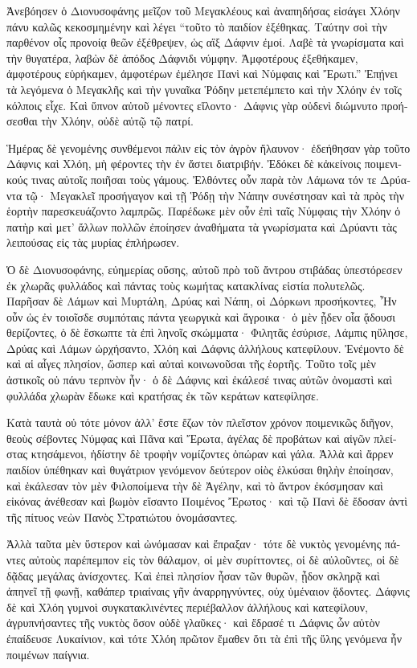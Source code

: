 \documentclass{book}
\begin{document}
\begin{pairs}
\begin{Leftside}
\begin{greek}
  Ἀνεβόησεν ὁ Διονυσοφάνης μεῖζον τοῦ Μεγακλέους καὶ ἀναπηδήσας εἰσάγει Χλόην πάνυ καλῶς κεκοσμημένην καὶ λέγει “τοῦτο τὸ παιδίον ἐξέθηκας. Ταύτην σοὶ τὴν παρθένον οἶς προνοίᾳ θεῶν ἐξέθρεψεν,  ὡς αἲξ Δάφνιν ἐμοί. Λαβὲ τὰ γνωρίσματα καὶ τὴν θυγατέρα, λαβὼν δὲ ἀπόδος Δάφνιδι νύμφην. Ἀμφοτέρους ἐξεθήκαμεν, ἀμφοτέρους εὑρήκαμεν, ἀμφοτέρων ἐμέλησε Πανὶ καὶ Νύμφαις καὶ Ἔρωτι.”  Ἐπῄνει τὰ λεγόμενα ὁ Μεγακλῆς καὶ τὴν γυναῖκα Ῥόδην μετεπέμπετο καὶ τὴν Χλόην ἐν τοῖς κόλποις εἶχε. Καὶ ὕπνον αὐτοῦ μένοντες εἵλοντο· Δάφνις γὰρ οὐδενὶ διώμνυτο προήσεσθαι τὴν Χλόην, οὐδὲ αὐτῷ τῷ πατρί.
\pend


  Ἡμέρας δὲ γενομένης συνθέμενοι πάλιν εἰς τὸν ἀγρὸν ἤλαυνον· ἐδεήθησαν γὰρ τοῦτο Δάφνις καὶ Χλόη, μὴ φέροντες τὴν ἐν ἄστει διατριβήν. Ἐδόκει δὲ κἀκείνοις ποιμενικούς τινας αὐτοῖς ποιῆσαι τοὺς γάμους.  Ἐλθόντες οὖν παρὰ τὸν Λάμωνα τόν τε Δρύαντα τῷ· Μεγακλεῖ προσήγαγον καὶ τῇ Ῥόδῃ τὴν Νάπην συνέστησαν καὶ τὰ πρὸς τὴν ἑορτὴν παρεσκευάζοντο λαμπρῶς. Παρέδωκε μὲν οὖν ἐπὶ ταῖς Νύμφαις τὴν Χλόην ὁ πατὴρ καὶ μετ’ ἄλλων πολλῶν ἐποίησεν ἀναθήματα τὰ γνωρίσματα καὶ Δρύαντι τὰς λειπούσας εἰς τὰς μυρίας ἐπλήρωσεν.
\pend


  Ὁ δὲ Διονυσοφάνης, εὐημερίας οὔσης, αὐτοῦ πρὸ τοῦ ἄντρου στιβάδας ὑπεστόρεσεν ἐκ χλωρᾶς φυλλάδος καὶ πάντας τοὺς κωμήτας κατακλίνας εἱστία πολυτελῶς.  Παρῆσαν δὲ Λάμων καὶ Μυρτάλη, Δρύας καὶ Νάπη, οἱ Δόρκωνι προσήκοντες,  Ἦν οὖν ὡς ἐν τοιοῖσδε συμπόταις πάντα γεωργικὰ καὶ ἄγροικα· ὁ μὲν ᾖδεν οἷα ᾅδουσι θερίζοντες, ὁ δὲ ἔσκωπτε τὰ ἐπὶ ληνοῖς σκώμματα· Φιλητᾶς ἐσύρισε, Λάμπις ηὔλησε, Δρύας καὶ Λάμων ὠρχήσαντο, Χλόη καὶ Δάφνις ἀλλήλους κατεφίλουν.  Ἐνέμοντο δὲ καὶ αἱ αἶγες πλησίον, ὥσπερ καὶ αὐταὶ κοινωνοῦσαι τῆς ἑορτῆς. Τοῦτο τοῖς μὲν ἀστικοῖς οὐ πάνυ τερπνὸν ἦν· ὁ δὲ Δάφνις καὶ ἐκάλεσέ τινας αὐτῶν ὀνομαστὶ καὶ φυλλάδα χλωρὰν ἔδωκε καὶ κρατήσας ἐκ τῶν κεράτων κατεφίλησε.
\pend


  Κατὰ ταυτὰ οὐ τότε μόνον ἀλλ’ ἔστε ἔζων τὸν πλεῖστον χρόνον ποιμενικῶς διῆγον, θεοὺς σέβοντες Νύμφας καὶ Πᾶνα καὶ Ἔρωτα, ἀγέλας δὲ προβάτων καὶ αἰγῶν πλείστας κτησάμενοι, ἡδίστην δὲ τροφὴν νομίζοντες ὀπώραν καὶ γάλα.  Ἀλλὰ καὶ ἄρρεν παιδίον ὑπέθηκαν καὶ θυγάτριον γενόμενον δεύτερον οἰὸς ἑλκύσαι θηλὴν ἐποίησαν, καὶ ἐκάλεσαν τὸν μὲν Φιλοποίμενα τὴν δὲ Ἀγέλην, καὶ τὸ ἄντρον ἐκόσμησαν καὶ εἰκόνας ἀνέθεσαν καὶ βωμὸν εἵσαντο Ποιμένος Ἔρωτος· καὶ τῷ Πανὶ δὲ ἔδοσαν ἀντὶ τῆς πίτυος νεὼν Πανὸς Στρατιώτου ὀνομάσαντες.
\pend


  Ἀλλὰ ταῦτα μὲν ὕστερον καὶ ὠνόμασαν καὶ ἔπραξαν· τότε δὲ νυκτὸς γενομένης πάντες αὐτοὺς παρέπεμπον εἰς τὸν θάλαμον, οἱ μὲν συρίττοντες, οἱ δὲ αὐλοῦντες, οἱ δὲ δᾷδας μεγάλας ἀνίσχοντες.  Καὶ ἐπεὶ πλησίον ἦσαν τῶν θυρῶν, ᾖδον σκληρᾷ καὶ ἀπηνεῖ τῇ φωνῇ, καθάπερ τριαίναις γῆν ἀναρρηγνύντες, οὐχ ὑμέναιον ᾅδοντες.  Δάφνις δὲ καὶ Χλόη γυμνοὶ συγκατακλινέντες περιέβαλλον ἀλλήλους καὶ κατεφίλουν, ἀγρυπνήσαντες τῆς νυκτὸς ὅσον οὐδὲ γλαῦκες· καὶ ἔδρασέ τι Δάφνις ὧν αὐτὸν ἐπαίδευσε Λυκαίνιον, καὶ τότε Χλόη πρῶτον ἔμαθεν ὅτι τὰ ἐπὶ τῆς ὕλης γενόμενα ἦν ποιμένων παίγνια.
\pend
\endnumbering
\end{greek}
\end{Leftside}

\end{pairs}
\Columns
\end{document}

